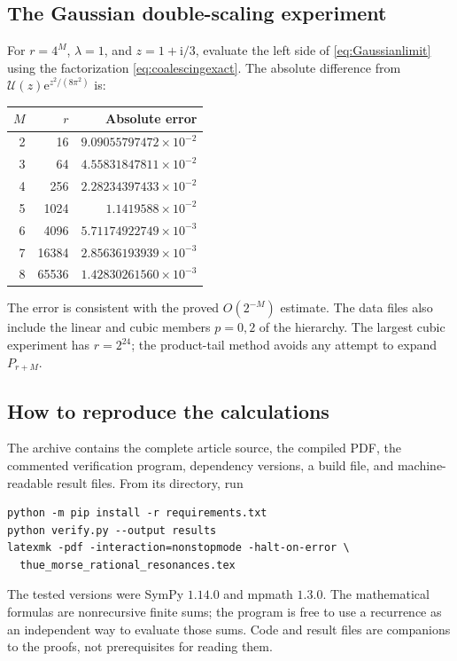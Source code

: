 \documentclass[11pt,letterpaper]{article}
\numberwithin{equation}{section}
\theoremstyle{definition}
\theoremstyle{remark}
\newcommand{\ii}{\mathrm i}
\newcommand{\Up}{\mathcal U}
\newcommand{\e}{\mathrm e}
\begin{document}
\subsection{The Gaussian double-scaling experiment}
For \(r=4^M\), \(\lambda=1\), and \(z=1+\ii/3\), evaluate the left side of \eqref{eq:Gaussianlimit} using the factorization \eqref{eq:coalescingexact}. The absolute difference from \(\Up(z)\e^{z^2/(8\pi^2)}\) is:
\begin{center}
\begin{tabular}{rrr}
\toprule
\(M\)&\(r\)&Absolute error\\
\midrule
2&16&\(9.09055797472\times10^{-2}\)\\
3&64&\(4.55831847811\times10^{-2}\)\\
4&256&\(2.28234397433\times10^{-2}\)\\
5&1024&\(1.1419588\times10^{-2}\)\\
6&4096&\(5.71174922749\times10^{-3}\)\\
7&16384&\(2.85636193939\times10^{-3}\)\\
8&65536&\(1.42830261560\times10^{-3}\)\\
\bottomrule
\end{tabular}
\end{center}
The error is consistent with the proved \(O(2^{-M})\) estimate. The data files also include the linear and cubic members \(p=0,2\) of the hierarchy. The largest cubic experiment has \(r=2^{24}\); the product-tail method avoids any attempt to expand \(P_{r+M}\).

\subsection{How to reproduce the calculations}
The archive contains the complete article source, the compiled PDF, the commented verification program, dependency versions, a build file, and machine-readable result files. From its directory, run
\begin{verbatim}
python -m pip install -r requirements.txt
python verify.py --output results
latexmk -pdf -interaction=nonstopmode -halt-on-error \
  thue_morse_rational_resonances.tex
\end{verbatim}
The tested versions were SymPy \(1.14.0\) and mpmath \(1.3.0\). The mathematical formulas are nonrecursive finite sums; the program is free to use a recurrence as an independent way to evaluate those sums. Code and result files are companions to the proofs, not prerequisites for reading them.
\end{document}
